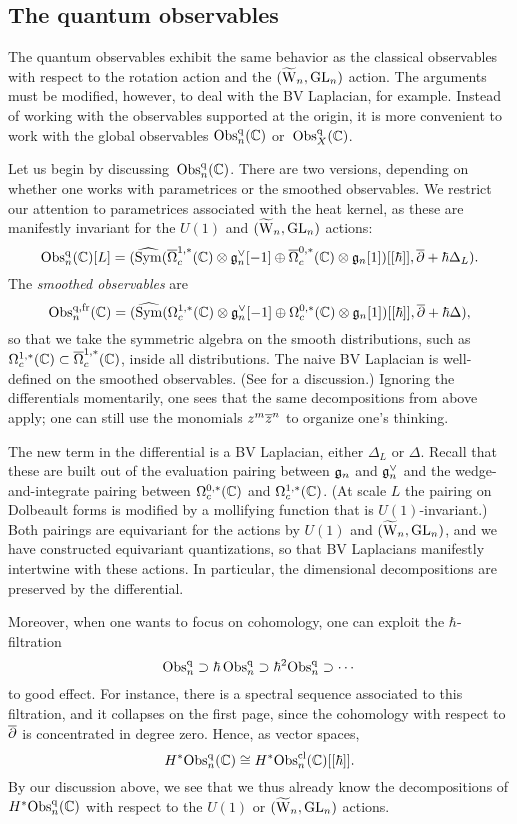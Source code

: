 \subsection{The quantum observables}

The quantum observables exhibit the same behavior as the classical observables
with respect to the rotation action and the $(\widetilde{{{\rm W}}}_n,{\rm GL}_n)$ action.
The arguments must be modified, however, to deal with the BV Laplacian, for example.
Instead of working with the observables supported at the origin, 
it is more convenient to work with the global observables ${\rm Obs}^{\rm q}_n(\mathbb C)$ or~${\rm Obs}^{\rm q}_X(\mathbb C)$.

Let us begin by discussing~${\rm Obs}^{\rm q}_n(\mathbb C)$.
There are two versions, depending on whether one works with parametrices or the smoothed observables.
We restrict our attention to parametrices associated with the heat kernel, 
as these are manifestly invariant for the $U(1)$ and $(\widetilde{{{\rm W}}}_n,{\rm GL}_n)$ actions:
\[
{\rm Obs}^{\rm q}_n(\mathbb C)[L] = (\widehat{{\rm Sym}}(\overline{\Omega}^{1,*}_c(\mathbb C) \otimes \mathfrak{g}_n^\vee[-1] \oplus \overline{\Omega}^{0,*}_c(\mathbb C) \otimes \mathfrak{g}_n[1])[[\hbar]], \overline{\partial} + \hbar \Delta_L).
\]
The {\em smoothed observables} are
\[
{{\rm Obs}}^{{\rm q},{\rm fr}}_n(\mathbb C) = (\widehat{{\rm Sym}}(\Omega^{1,*}_c(\mathbb C) \otimes \mathfrak{g}_n^\vee[-1] \oplus \Omega^{0,*}_c(\mathbb C) \otimes \mathfrak{g}_n[1])[[\hbar]], \overline{\partial} + \hbar \Delta),
\]
so that we take the symmetric algebra on the smooth distributions,
such as $\Omega^{1,*}_c(\mathbb C) \subset \overline{\Omega}^{1,*}_c(\mathbb C)$, inside all distributions. 
The naive BV Laplacian is well-defined on the smoothed observables. 
(See \cite{CG} for a discussion.)
Ignoring the differentials momentarily, one sees that the same decompositions from above apply;
one can still use the monomials $z^m \overline{z}^n$ to organize one's
thinking.

The new term in the differential is a BV Laplacian, either $\Delta_L$ or $\Delta$.
Recall that these are built out of the evaluation pairing between $\mathfrak{g}_n$ and $\mathfrak{g}_n^\vee$
and the wedge-and-integrate pairing between $\Omega^{0,*}_c(\mathbb C)$ and $\Omega^{1,*}_c(\mathbb C)$.
(At scale $L$ the pairing on Dolbeault forms is modified by a mollifying function that is $U(1)$-invariant.)
Both pairings are equivariant for the actions by $U(1)$ and $(\widetilde{{{\rm W}}}_n,{\rm GL}_n)$,
and we have constructed equivariant quantizations, 
so that BV Laplacians manifestly intertwine with these actions.
In particular, the dimensional decompositions are preserved by the differential.
 
Moreover, when one wants to focus on cohomology, one can exploit the $\hbar$-filtration 
\[
{\rm Obs}^{\rm q}_n \supset \hbar\, {\rm Obs}^{\rm q}_n \supset \hbar^2 {\rm Obs}^{\rm q}_n \supset \cdots
\]
to good effect. 
For instance, there is a spectral sequence associated to this filtration, 
and it collapses on the first page, since the cohomology with respect to $\overline{\partial}$ is concentrated in degree zero.
Hence, as vector spaces,
\[
H^* {\rm Obs}^{\rm q}_n(\mathbb C) \cong H^* {\rm Obs}^{\rm cl}_n(\mathbb C)[[\hbar]].
\]
By our discussion above, we see that we thus already know the decompositions
of $H^* {\rm Obs}^{\rm q}_n(\mathbb C)$ with respect to the $U(1)$ or $(\widetilde{{{\rm W}}}_n,{\rm GL}_n)$ actions.

